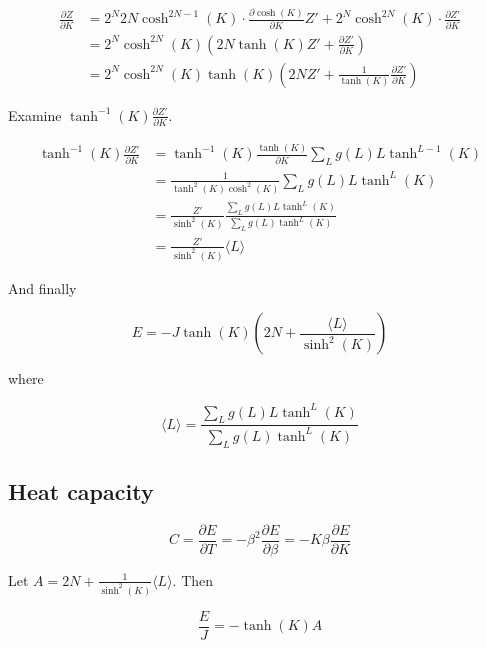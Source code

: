 \begin{align*}
    \frac{\partial Z}{\partial K} &= 2^N 2N \cosh^{2N-1}(K) \cdot \frac{\partial \cosh(K)}{\partial K} Z' + 2^N \cosh^{2N}(K) \cdot \frac{\partial Z'}{\partial K} \\
    &= 2^N \cosh^{2N}(K) \left ( 2N \tanh(K) Z' + \frac{\partial Z'}{\partial K} \right ) \\
    &= 2^N \cosh^{2N}(K) \tanh(K) \left ( 2N Z' + \frac{1}{\tanh(K)}\frac{\partial Z'}{\partial K} \right )
\end{align*}

Examine $\tanh^{-1}(K) \frac{\partial Z'}{\partial K}$.

\begin{align*}
    \tanh^{-1}(K) \frac{\partial Z'}{\partial K} &= \tanh^{-1}(K) \frac{\tanh(K)}{\partial K} \sum_L g(L) L \tanh^{L-1}(K) \\
    &= \frac{1}{\tanh^2(K)\cosh^2(K)} \sum_L g(L) L \tanh^L(K) \\
    &= \frac{Z'}{\sinh^2(K)} \frac{\sum_L g(L) L \tanh^L(K)}{\sum_L g(L) \tanh^L(K)} \\
    &= \frac{Z'}{\sinh^2(K)} \langle L \rangle
\end{align*}

And finally

\begin{equation}
    E = -J \tanh(K) \left ( 2N + \frac{\langle L \rangle}{\sinh^2(K)} \right )
\end{equation}

where

\begin{equation}
    \langle L \rangle = \frac{\sum_L g(L) L \tanh^L(K)}{\sum_L g(L) \tanh^L(K)}
\end{equation}


\subsection{Heat capacity}

\begin{equation}
    C = \frac{\partial E}{\partial T} = - \beta^2 \frac{\partial E}{\partial \beta} = -K \beta \frac{\partial E}{\partial K}
\end{equation}

Let $A = 2N + \frac{1}{\sinh^2(K)} \langle L \rangle$. Then

\begin{equation}
    \frac{E}{J} = - \tanh(K) A
\end{equation}

